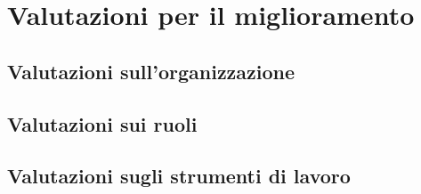 \chapter{Valutazioni per il miglioramento}\label{valutazioni-per-il-miglioramento}

\section{Valutazioni sull'organizzazione}

\section{Valutazioni sui ruoli}

\section{Valutazioni sugli strumenti di lavoro}